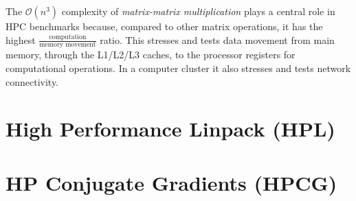 The $\mathcal{O}(n^3)$ complexity of \emph{matrix-matrix multiplication} plays a central role in HPC benchmarks because, compared to other matrix operations, it has the highest $\frac{\text{computation}}{\text{memory movement}}$ ratio. This stresses and tests data movement from main memory, through the L1/L2/L3 caches, to the processor registers for computational operations. In a computer cluster it also stresses and tests network connectivity.



%
%
\section{High Performance Linpack (HPL)}


%
%
\section{HP Conjugate Gradients (HPCG)}



